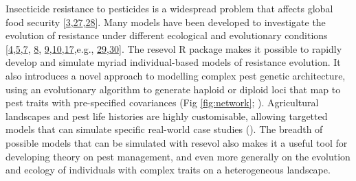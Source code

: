 \documentclass[10pt,letterpaper]{article}
\begin{document}
Insecticide resistance to pesticides is a widespread problem that affects global food security {[}\protect\hyperlink{ref-Lykogianni2021}{3},\protect\hyperlink{ref-Tabashnik2014}{27},\protect\hyperlink{ref-Bradshaw2016}{28}{]}.
Many models have been developed to investigate the evolution of resistance under different ecological and evolutionary conditions {[}\protect\hyperlink{ref-Ives2002}{4},\protect\hyperlink{ref-Liang2013}{5},\protect\hyperlink{ref-Liang2018}{7}, \protect\hyperlink{ref-South2018}{8}, \protect\hyperlink{ref-Sudo2018}{9},\protect\hyperlink{ref-Saikai2021}{10},\protect\hyperlink{ref-Haridas2018}{17},e.g., \protect\hyperlink{ref-Curtis1985}{29},\protect\hyperlink{ref-Mani1985}{30}{]}.
The resevol R package makes it possible to rapidly develop and simulate myriad individual-based models of resistance evolution.
It also introduces a novel approach to modelling complex pest genetic architecture, using an evolutionary algorithm to generate haploid or diploid loci that map to pest traits with pre-specified covariances (Fig \ref{fig:network}; ).
Agricultural landscapes and pest life histories are highly customisable, allowing targetted models that can simulate specific real-world case studies ().
The breadth of possible models that can be simulated with resevol also makes it a useful tool for developing theory on pest management, and even more generally on the evolution and ecology of individuals with complex traits on a heterogeneous landscape.





\nolinenumbers
\end{document}
